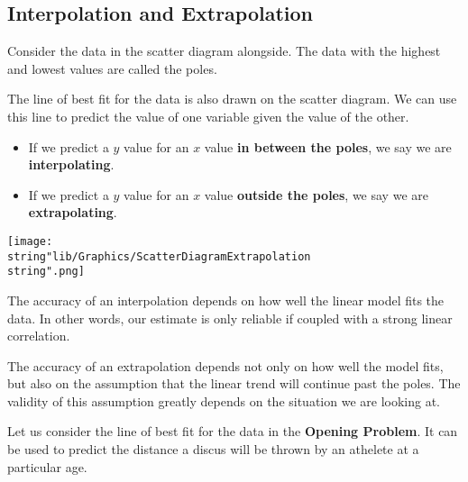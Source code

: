 \documentclass[11pt,a4paper]{book}
\begin{document}
\subsection{Interpolation and Extrapolation}

Consider the data in the scatter diagram alongside. The data with
the highest and lowest values are called the poles.

\begin{minipage}[t]{.5\textwidth}

The line of best fit for the data is also drawn on the scatter diagram.
We can use this line to predict the value of one variable given the
value of the other.
\begin{itemize}
\item If we predict a $y$ value for an $x$ value \textbf{in between the
poles}, we say we are \textbf{interpolating}.
\item If we predict a $y$ value for an $x$ value \textbf{outside the poles},
we say we are \textbf{extrapolating}.
\end{itemize}
\end{minipage}
\begin{minipage}[t]{.5\textwidth}
\begin{center}
\texttt{[image: \\string"lib/Graphics/ScatterDiagramExtrapolation\\string".png]}
\par\end{center}

\end{minipage}

The accuracy of an interpolation depends on how well the linear model
fits the data. In other words, our estimate is only reliable if coupled
with a strong linear correlation.

The accuracy of an extrapolation depends not only on how well the
model fits, but also on the assumption that the linear trend will
continue past the poles. The validity of this assumption greatly depends
on the situation we are looking at.

Let us consider the line of best fit for the data in the \textbf{Opening
Problem}. It can be used to predict the distance a discus will be
thrown by an athelete at a particular age.
\end{document}
